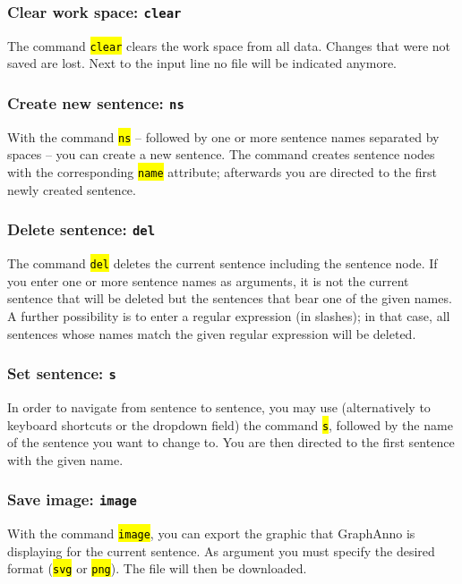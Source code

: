 \documentclass[12pt]{scrartcl}
\newcommand{\code}[1]{\hl{\texttt{#1}}}
\begin{document}
\subsubsection{Clear work space: \texttt{clear}}

The command \code{clear} clears the work space from all data.
Changes that were not saved are lost.
Next to the input line no file will be indicated anymore.


\subsubsection{Create new sentence: \texttt{ns}}\label{befehl-ns}

With the command \code{ns} – followed by one or more sentence names separated by spaces – you can create a new sentence.
The command creates sentence nodes with the corresponding \code{name} attribute; afterwards you are directed to the first newly created sentence.


\subsubsection{Delete sentence: \texttt{del}}

The command \code{del} deletes the current sentence including the sentence node.
If you enter one or more sentence names as arguments, it is not the current sentence that will be deleted but the sentences that bear one of the given names.
A further possibility is to enter a regular expression (in slashes); in that case, all sentences whose names match the given regular expression will be deleted.


\subsubsection{Set sentence: \texttt{s}}

In order to navigate from sentence to sentence, you may use (alternatively to keyboard shortcuts or the dropdown field) the command \code{s}, followed by the name of the sentence you want to change to.
You are then directed to the first sentence with the given name.


\subsubsection{Save image: \texttt{image}}

With the command \code{image}, you can export the graphic that GraphAnno is displaying for the current sentence.
As argument you must specify the desired format (\code{svg} or \code{png}).
The file will then be downloaded.
\end{document}
